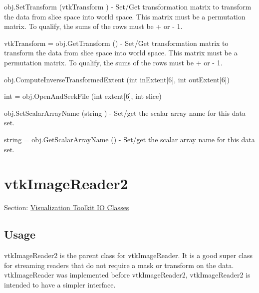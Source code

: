 \begin{DoxyItemize}
\item {\ttfamily obj.\-Set\-Transform (vtk\-Transform )} -\/ Set/\-Get transformation matrix to transform the data from slice space into world space. This matrix must be a permutation matrix. To qualify, the sums of the rows must be + or -\/ 1.  
\item {\ttfamily vtk\-Transform = obj.\-Get\-Transform ()} -\/ Set/\-Get transformation matrix to transform the data from slice space into world space. This matrix must be a permutation matrix. To qualify, the sums of the rows must be + or -\/ 1.  
\item {\ttfamily obj.\-Compute\-Inverse\-Transformed\-Extent (int in\-Extent\mbox{[}6\mbox{]}, int out\-Extent\mbox{[}6\mbox{]})}  
\item {\ttfamily int = obj.\-Open\-And\-Seek\-File (int extent\mbox{[}6\mbox{]}, int slice)}  
\item {\ttfamily obj.\-Set\-Scalar\-Array\-Name (string )} -\/ Set/get the scalar array name for this data set.  
\item {\ttfamily string = obj.\-Get\-Scalar\-Array\-Name ()} -\/ Set/get the scalar array name for this data set.  
\end{DoxyItemize}\hypertarget{vtkio_vtkimagereader2}{}\section{vtk\-Image\-Reader2}\label{vtkio_vtkimagereader2}
Section\-: \hyperlink{sec_vtkio}{Visualization Toolkit I\-O Classes} \hypertarget{vtkwidgets_vtkxyplotwidget_Usage}{}\subsection{Usage}\label{vtkwidgets_vtkxyplotwidget_Usage}
vtk\-Image\-Reader2 is the parent class for vtk\-Image\-Reader. It is a good super class for streaming readers that do not require a mask or transform on the data. vtk\-Image\-Reader was implemented before vtk\-Image\-Reader2, vtk\-Image\-Reader2 is intended to have a simpler interface.

